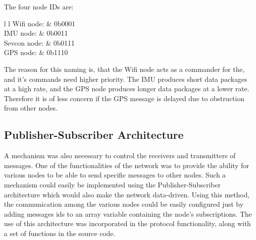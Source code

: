 The four node IDs are:
\begin{table}[h]
	\begin{tabular}{{l} {l}}
		Wifi node: & 0b0001 \\
		IMU node: & 0b0011 \\
		Sevcon node: & 0b0111 \\
		GPS node: & 0b1110
	\end{tabular}
\end{table}

The reason for this naming is, that the Wifi node acts as a commander for the, and it's commands need higher priority.
The IMU produces short data packages at a high rate, and the GPS node produces longer data packages at a lower rate. 
Therefore it is of less concern if the GPS message is delayed due to obstruction from other nodes. 

\subsection{Publisher-Subscriber Architecture}
A mechanism was also necessary to control the receivers and transmitters of messages.
One of the functionalities of the network was to provide the ability for various nodes to be able to send specific messages to other nodes.
Such a mechanism could easily be implemented using the Publisher-Subscriber architecture which would also make the network data-driven.
Using this method, the communication among the various nodes could be easily configured just by adding messages ids to an array variable containing the node's subscriptions.
The use of this architecture was incorporated in the protocol functionality, along with a set of functions in the source code.